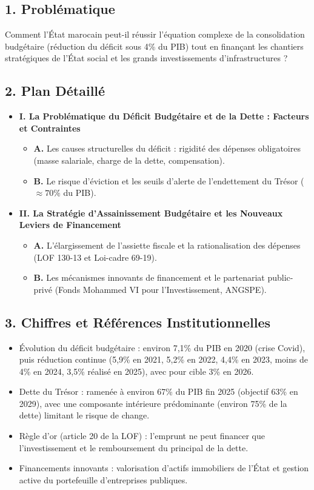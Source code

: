 \subsection*{1. Problématique}
Comment l'État marocain peut-il réussir l'équation complexe de la consolidation budgétaire (réduction du déficit sous 4\% du PIB) tout en finançant les chantiers stratégiques de l'État social et les grands investissements d'infrastructures ?

\subsection*{2. Plan Détaillé}
\begin{itemize}
    \item \textbf{I. La Problématique du Déficit Budgétaire et de la Dette : Facteurs et Contraintes}
    \begin{itemize}
        \item \textbf{A.} Les causes structurelles du déficit : rigidité des dépenses obligatoires (masse salariale, charge de la dette, compensation).
        \item \textbf{B.} Le risque d'éviction et les seuils d'alerte de l'endettement du Trésor ($\approx 70\%$ du PIB).
    \end{itemize}
    \item \textbf{II. La Stratégie d'Assainissement Budgétaire et les Nouveaux Leviers de Financement}
    \begin{itemize}
        \item \textbf{A.} L'élargissement de l'assiette fiscale et la rationalisation des dépenses (LOF 130-13 et Loi-cadre 69-19).
        \item \textbf{B.} Les mécanismes innovants de financement et le partenariat public-privé (Fonds Mohammed VI pour l'Investissement, ANGSPE).
    \end{itemize}
\end{itemize}

\subsection*{3. Chiffres et Références Institutionnelles}
\begin{itemize}
    \item Évolution du déficit budgétaire : environ 7,1\% du PIB en 2020 (crise Covid), puis réduction continue (5,9\% en 2021, 5,2\% en 2022, 4,4\% en 2023, moins de 4\% en 2024, 3,5\% réalisé en 2025), avec pour cible 3\% en 2026.
    \item Dette du Trésor : ramenée à environ 67\% du PIB fin 2025 (objectif 63\% en 2029), avec une composante intérieure prédominante (environ 75\% de la dette) limitant le risque de change.
    \item Règle d'or (article 20 de la LOF) : l'emprunt ne peut financer que l'investissement et le remboursement du principal de la dette.
    \item Financements innovants : valorisation d'actifs immobiliers de l'État et gestion active du portefeuille d'entreprises publiques.
\end{itemize}

